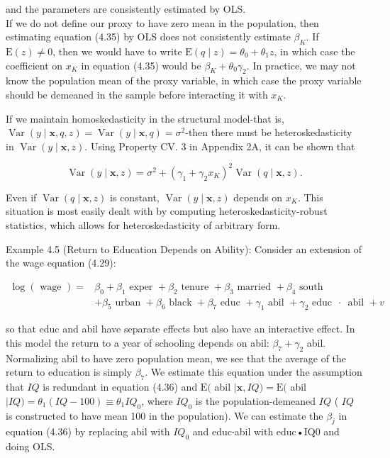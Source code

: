 \documentclass[10pt]{article}
\begin{document}
and the parameters are consistently estimated by OLS.\\
If we do not define our proxy to have zero mean in the population, then estimating equation (4.35) by OLS does not consistently estimate $\beta_{K}$. If $\mathrm{E}(z) \neq 0$, then we would have to write $\mathrm{E}(q \mid z)=\theta_{0}+\theta_{1} z$, in which case the coefficient on $x_{K}$ in equation (4.35) would be $\beta_{K}+\theta_{0} \gamma_{2}$. In practice, we may not know the population mean of the proxy variable, in which case the proxy variable should be demeaned in the sample before interacting it with $x_{K}$.

If we maintain homoskedasticity in the structural model-that is, $\operatorname{Var}(y \mid \mathbf{x}, q, z)= \operatorname{Var}(y \mid \mathbf{x}, q)=\sigma^{2}$-then there must be heteroskedasticity in $\operatorname{Var}(y \mid \mathbf{x}, z)$. Using Property CV. 3 in Appendix 2A, it can be shown that

$$
\operatorname{Var}(y \mid \mathbf{x}, z)=\sigma^{2}+\left(\gamma_{1}+\gamma_{2} x_{K}\right)^{2} \operatorname{Var}(q \mid \mathbf{x}, z) .
$$

Even if $\operatorname{Var}(q \mid \mathbf{x}, z)$ is constant, $\operatorname{Var}(y \mid \mathbf{x}, z)$ depends on $x_{K}$. This situation is most easily dealt with by computing heteroskedasticity-robust statistics, which allows for heteroskedasticity of arbitrary form.

Example 4.5 (Return to Education Depends on Ability): Consider an extension of the wage equation (4.29):


\begin{align*}
\log (\text { wage })= & \beta_{0}+\beta_{1} \text { exper }+\beta_{2} \text { tenure }+\beta_{3} \text { married }+\beta_{4} \text { south } \\
& +\beta_{5} \text { urban }+\beta_{6} \text { black }+\beta_{7} \text { educ }+\gamma_{1} \text { abil }+\gamma_{2} \text { educ } \text { ⋅ } \text { abil }+v \tag{4.36}
\end{align*}


so that educ and abil have separate effects but also have an interactive effect. In this model the return to a year of schooling depends on abil: $\beta_{7}+\gamma_{2}$ abil. Normalizing abil to have zero population mean, we see that the average of the return to education is simply $\beta_{7}$. We estimate this equation under the assumption that $I Q$ is redundant in equation (4.36) and $\mathrm{E}($ abil $\mid \mathbf{x}, I Q)=\mathrm{E}($ abil $\mid I Q)=\theta_{1}(I Q-100) \equiv \theta_{1} I Q_{0}$, where $I Q_{0}$ is the population-demeaned $I Q$ ( $I Q$ is constructed to have mean 100 in the population). We can estimate the $\beta_{j}$ in equation (4.36) by replacing abil with $I Q_{0}$ and educ‧abil with educ•IQ0 and doing OLS.
\end{document}
